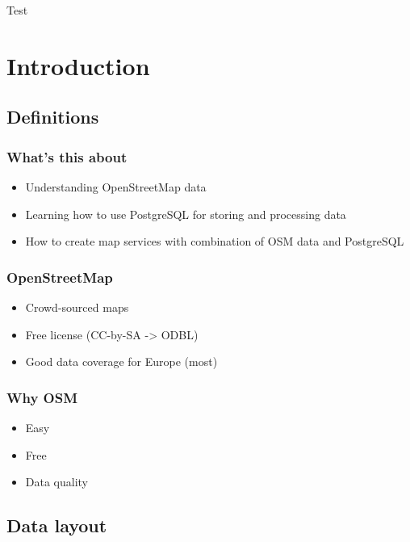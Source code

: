 \documentclass{beamer}
\begin{document}
\begin{frame}{Test}
  \begin{center}
    
  \end{center}
\end{frame}

\section{Introduction}

\subsection{Definitions}
\label{sec:definitions}

\begin{frame}
  \frametitle{What's this about}
  \begin{itemize}
  \item Understanding OpenStreetMap data
  \item Learning how to use PostgreSQL for storing and processing data
  \item How to create map services with combination of OSM data and PostgreSQL
  \end{itemize}
\end{frame}

\begin{frame}
  \frametitle{OpenStreetMap}
  \begin{itemize}
  \item Crowd-sourced maps
  \item Free license (CC-by-SA -> ODBL)
  \item Good data coverage for Europe (most)
  \end{itemize}
\end{frame}

\begin{frame}
  \frametitle{Why OSM}
  \begin{itemize}
  \item Easy
  \item Free
  \item Data quality
  \end{itemize}
\end{frame}

\subsection{Data layout}
\label{sec:diving}
\end{document}
